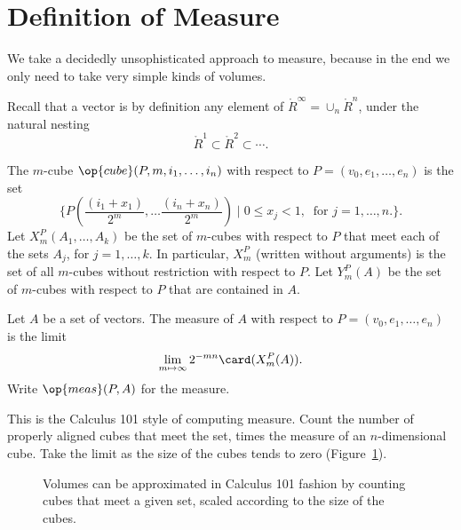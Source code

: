

\def\aspan#1{{\langle #1\rangle}}

\section{Definition of Measure}

We take a decidedly unsophisticated approach to measure, because in
the end we only need to take very simple kinds of volumes.

Recall that a vector is by definition any element of
$\ring{R}^\infty = \cup_n \ring{R}^n$, under the natural nesting
    $$\ring{R}^1 \subset \ring{R}^2 \subset \cdots.$$


\begin{definition}
    The $m$-cube  $\op{cube}(P,m,i_1,\ldots,i_n)$
    with respect to $P=(v_0,e_1,\ldots,e_n)$ is the
    set
        $$\{P(\frac{(i_1+x_1)}{2^m},\ldots\frac{(i_n+x_n)}{2^m}) \mid 0 \le
        x_j
        < 1,\ \text{ for } j=1,\ldots,n.\}.$$
Let $X^P_m(A_1,\ldots,A_k)$ be the set of $m$-cubes with respect to
$P$ that meet each of the sets $A_j$, for $j=1,\ldots,k$.  In
particular, $X^P_m$ (written without arguments) is the set of all
$m$-cubes without restriction with respect to $P$. Let $Y^P_m(A)$ be
the set of $m$-cubes with respect to $P$ that are contained in $A$.
\end{definition}

\begin{definition}
    Let $A$ be a set of vectors.  The measure of $A$ with respect to
        $P=(v_0,e_1,\ldots,e_n)$ is the limit
    \begin{equation}\label{eqn:measure}
    \lim_{m\mapsto\infty} 2^{-m n}\card(X^P_m(A)).
    \end{equation}
    Write $\op{meas} (P,A)$ for the measure.
\end{definition}

This is the Calculus 101 style of computing measure.  Count the
number of properly aligned cubes that meet the set, times the
measure of an $n$-dimensional cube.  Take the limit as the size of
the cubes tends to zero  (Figure~\ref{fig:cubes}).

\begin{figure}[htb]
  \centering
  \caption{Volumes can be approximated in Calculus
  101 fashion by counting cubes
   that meet a given set, scaled according to the size of the cubes.}
  \label{fig:cubes}
\end{figure}




